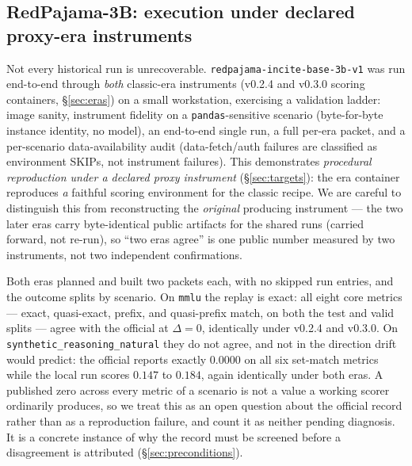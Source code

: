 \subsection{RedPajama-3B: execution under declared proxy-era instruments}
\label{sec:redpajama}

Not every historical run is unrecoverable. \texttt{redpajama-incite-base-3b-v1}
\citep{together2023redpajama} was run end-to-end through \emph{both} classic-era instruments (v0.2.4 and v0.3.0
scoring containers, \S\ref{sec:eras}) on a small workstation, exercising a
validation ladder: image sanity, instrument fidelity on a \texttt{pandas}-sensitive
scenario (byte-for-byte instance identity, no model), an end-to-end single run, a
full per-era packet, and a per-scenario data-availability audit (data-fetch/auth
failures are classified as environment SKIPs, not instrument failures). This
demonstrates \emph{procedural reproduction under a declared proxy instrument}
(\S\ref{sec:targets}): the era container reproduces \emph{a} faithful scoring
environment for the classic recipe. We are careful to distinguish this from
reconstructing the \emph{original} producing instrument --- the two later eras
carry byte-identical public artifacts for the shared runs (carried forward, not
re-run), so ``two eras agree'' is one public number measured by two instruments,
not two independent confirmations.

Both eras planned and built two packets each, with no skipped run entries, and the
outcome splits by scenario. On \texttt{mmlu} the replay is exact: all eight core
metrics --- exact, quasi-exact, prefix, and quasi-prefix match, on both the test
and valid splits --- agree with the official at $\Delta = 0$, identically under
v0.2.4 and v0.3.0. On \texttt{synthetic\_reasoning\_natural} they do not agree,
and not in the direction drift would predict: the official reports exactly
$0.0000$ on all six set-match metrics while the local run scores $0.147$ to
$0.184$, again identically under both eras. A published zero across every metric
of a scenario is not a value a working scorer ordinarily produces, so we treat
this as an open question about the official record rather than as a reproduction
failure, and count it as neither pending diagnosis. It is a concrete instance of
why the record must be screened before a disagreement is attributed
(\S\ref{sec:preconditions}).
\par\smallskip\noindent{}\par\smallskip


